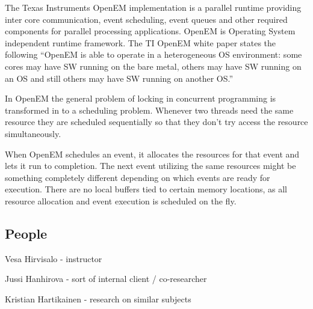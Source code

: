 The Texas Instruments OpenEM implementation is a parallel runtime providing inter core communication, event scheduling, event queues and other required components for parallel processing applications. OpenEM is Operating System independent runtime framework. The TI OpenEM white paper states the following ``OpenEM is able to operate in a heterogeneous OS environment: some cores may have SW running on the bare metal, others may have SW running on an OS and still others may have SW running on another OS.''

In OpenEM the general problem of locking in concurrent programming is transformed in to a scheduling problem. Whenever two threads need the same resource they are scheduled sequentially so that they don't try access the resource simultaneously.

When OpenEM schedules an event, it allocates the resources for that event and lets it run to completion. The next event utilizing the same resources might be something completely different depending on which events are ready for execution. There are no local buffers tied to certain memory locations, as all resource allocation and event execution is scheduled on the fly.
\subsection{People}
Vesa Hirvisalo - instructor

Jussi Hanhirova - sort of internal client / co-researcher

Kristian Hartikainen - research on similar subjects